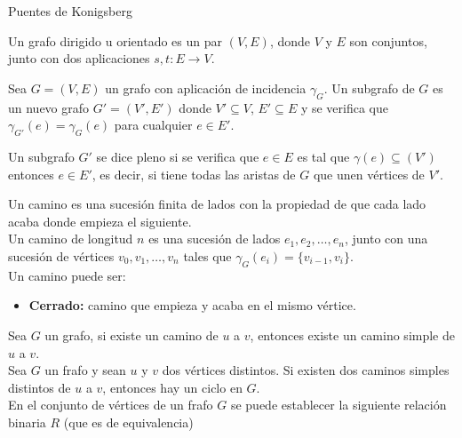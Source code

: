 \begin{ejemplo}
    Puentes de Konigsberg
\end{ejemplo}

\begin{definicion}
    Un grafo dirigido u orientado es un par $(V,E)$, donde $V$ y $E$ son conjuntos, junto con dos aplicaciones $s,t:E \to V$.
\end{definicion}

\begin{definicion}
    Sea $G=(V,E)$ un grafo con aplicación de incidencia $\gamma_G$. Un subgrafo de $G$ es un nuevo grafo $G'=(V',E')$ donde $V'\subseteq V$, $E'\subseteq E$ y se verifica que $\gamma_{G'}(e) = \gamma_G(e)$ para cualquier $e\in E'$.
\end{definicion}

\begin{definicion}
    Un subgrafo $G'$ se dice pleno si se verifica que $e\in E$ es tal que $\gamma(e)\subseteq(V')$ entonces $e \in E'$, es decir, si tiene todas las aristas de $G$ que unen vértices de $V'$.
\end{definicion}

\begin{definicion}
    Un camino es una sucesión finita de lados con la propiedad de que cada lado acaba donde empieza el siguiente.\\

    Un camino de longitud $n$ es una sucesión de lados $e_1,e_2,\dots,e_n$, junto con una sucesión de vértices $v_0,v_1,\dots,v_n$ tales que $\gamma_G(e_i) = \{v_{i-1}, v_i\}$.\\

    Un camino puede ser:
    \begin{itemize}
        \item \textbf{Cerrado:} camino que empieza y acaba en el mismo vértice.
    \end{itemize}
\end{definicion}

Sea $G$ un grafo, si existe un camino de $u$ a $v$, entonces existe un camino simple de $u$ a $v$.\\

Sea $G$ un frafo y sean $u$ y $v$ dos vértices distintos. Si existen dos caminos simples distintos de $u$ a $v$, entonces hay un ciclo en $G$.\\

En el conjunto de vértices de un frafo $G$ se puede establecer la siguiente relación binaria $R$ (que es de equivalencia)

